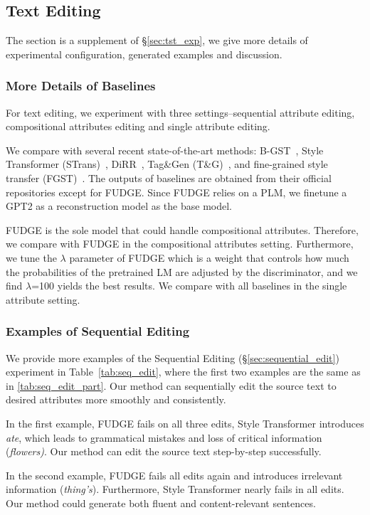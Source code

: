 \documentclass[11pt]{article}
\begin{document}
\subsection{Text Editing}
The section is a supplement of \S\ref{sec:tst_exp}, we give more details of experimental configuration, generated examples and discussion.
\subsubsection{More Details of Baselines}
\label{app:baseline_text_edit}
For text editing, we experiment with three settings--sequential attribute editing, compositional attributes editing and single attribute editing. 

We compare with several recent state-of-the-art methods:
B-GST~\cite{DBLP:conf/emnlp/SudhakarUM19}, Style Transformer (STrans)~\cite{DBLP:conf/acl/DaiLQH19}, DiRR~\cite{DBLP:conf/naacl/LiuNW21}, Tag\&Gen (T\&G)~\cite{DBLP:conf/acl/MadaanSPPNYSBP20}, and fine-grained style transfer (FGST)~\cite{DBLP:conf/aaai/LiuFZPL20}. 
The outputs of baselines are obtained from their official repositories except for FUDGE. 
Since FUDGE relies on a PLM, we finetune a GPT2 as a reconstruction model as the base model.


FUDGE is the sole model that could handle compositional attributes. Therefore, we compare with FUDGE in the compositional attributes setting. Furthermore, we tune the $\lambda$ parameter of FUDGE which is a weight that controls how much the probabilities of the pretrained LM are adjusted by the discriminator, and we find $\lambda$=100 yields the best results. We compare with all baselines in the single attribute setting.
\subsubsection{Examples of Sequential Editing}
\label{app:example_seq_edit}
We provide more examples of the Sequential Editing (\S\ref{sec:sequential_edit}) experiment in Table~\ref{tab:seq_edit}, where the first two examples are the same as in \ref{tab:seq_edit_part}. Our method can sequentially edit the source text to desired attributes more smoothly and consistently.

In the first example, FUDGE fails on all three edits, Style Transformer introduces \textit{ate}, which leads to grammatical mistakes and loss of critical information (\textit{flowers)}. Our method can edit the source text step-by-step successfully. 

In the second example, FUDGE fails all edits again and introduces irrelevant information (\textit{thing's}). Furthermore, Style Transformer nearly fails in all edits. Our method could generate both fluent and content-relevant sentences. 
\end{document}
